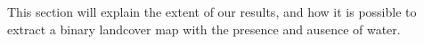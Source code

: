 This section will explain the extent of our results, and how it is possible to extract a binary landcover map with the presence and ausence of water.